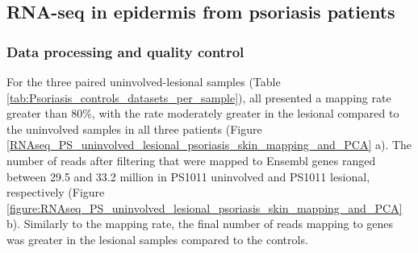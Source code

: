 

\subsection{RNA-seq in epidermis from psoriasis patients}

\subsubsection{Data processing and quality control}
For the three paired uninvolved-lesional samples (Table \ref{tab:Psoriasis_controls_datasets_per_sample}), all presented a mapping rate greater than 80\%, with the rate moderately greater in the lesional compared to the uninvolved samples in all three patients (Figure \ref{RNAseq_PS_uninvolved_lesional_psoriasis_skin_mapping_and_PCA} a). The number of reads after filtering that were mapped to Ensembl genes ranged between 29.5 and 33.2 million in PS1011 uninvolved and PS1011 lesional, respectively (Figure \ref{figure:RNAseq_PS_uninvolved_lesional_psoriasis_skin_mapping_and_PCA} b). Similarly to the mapping rate, the final number of reads mapping to genes was greater in the lesional samples compared to the controls.


